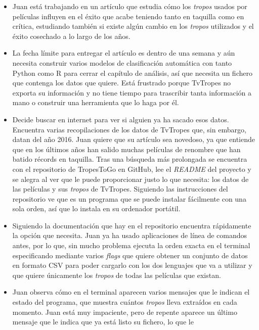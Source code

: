 \begin{itemize}
    \item Juan está trabajando en un artículo que estudia cómo los
    \textit{tropos} usados por películas influyen en el éxito que acabe teniendo
    tanto en taquilla como en crítica, estudiando también si existe algún cambio
    en los \textit{tropos} utilizados y el éxito cosechado a lo largo de los
    años.
    \item La fecha límite para entregar el artículo es dentro de una semana y
    aún necesita construir varios modelos de clasificación automática con tanto
    Python como R para cerrar el capítulo de análisis, así que necesita un
    fichero que contenga los datos que quiere. Está frustrado porque TvTropes no
    exporta su información y no tiene tiempo para trascribir tanta información a
    mano o construir una herramienta que lo haga por él.
    \item Decide buscar en internet para ver si alguien ya ha sacado esos datos.
    Encuentra varias recopilaciones de los datos de TvTropes que, sin embargo,
    datan del año 2016. Juan quiere que su artículo sea novedoso, ya que
    entiende que en los últimos años han salido muchas películas de renombre que
    han batido récords en taquilla. Tras una búsqueda más prolongada se
    encuentra con el repositorio de TropesToGo en GitHub, lee el \textit{README}
    del proyecto y se alegra al ver que le puede proporcionar justo lo que
    necesita: los datos de las películas y sus \textit{tropos} de TvTropes.
    Siguiendo las instrucciones del repositorio ve que es un programa que se
    puede instalar fácilmente con una sola orden, así que lo instala en su
    ordenador portátil.
    \item Siguiendo la documentación que hay en el repositorio encuentra
    rápidamente la opción que necesita. Juan ya ha usado aplicaciones de línea
    de comandos antes, por lo que, sin mucho problema ejecuta la orden exacta en
    el terminal especificando mediante varios \textit{flags} que quiere obtener
    un conjunto de datos en formato CSV para poder cargarlo con los dos
    lenguajes que va a utilizar y que quiere únicamente los \textit{tropos} de
    todas las películas que existan.
    \item Juan observa cómo en el terminal aparecen varios mensajes que le
    indican el estado del programa, que muestra cuántos \textit{tropos} lleva
    extraídos en cada momento. Juan está muy impaciente, pero de repente aparece
    un último mensaje que le indica que ya está listo su fichero, lo que le

\end{itemize}
